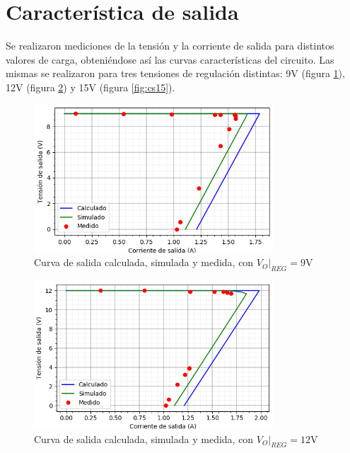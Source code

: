 \documentclass[e2_tp1_main.tex]{subfiles}
\begin{document}
\section{Caracter\'istica de salida}


Se realizaron mediciones de la tensi\'on y la corriente de salida para distintos valores de carga, obteni\'endose as\'i las curvas caracter\'isticas del circuito. Las mismas se realizaron para tres tensiones de regulaci\'on distintas: 9V (figura \ref{fig:cs9}), 12V (figura \ref{fig:cs12}) y 15V (figura \ref{fig:cs15}).

\begin{figure}[!htp]
	\centering
	\includegraphics[width=0.8\textwidth]
	{curvas_salida/e2_tp1_carac_salida_9V.png}
	\caption{Curva de salida calculada, simulada y medida, con $V_O|_{REG}=9$V}
	\label{fig:cs9}
\end{figure}

\begin{figure}[!htp]
	\centering
	\includegraphics[width=0.8\textwidth]
	{curvas_salida/e2_tp1_carac_salida_12V.png}
	\caption{Curva de salida calculada, simulada y medida, con $V_O|_{REG}=12$V}
	\label{fig:cs12}
\end{figure}
\end{document}
